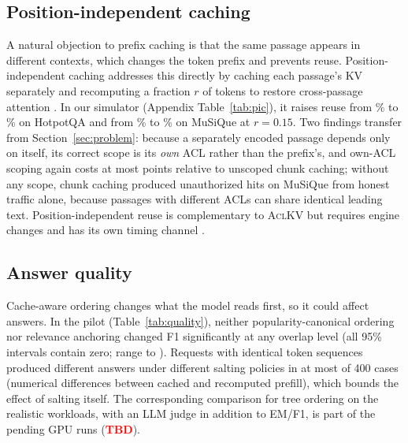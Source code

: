 \documentclass[11pt]{article}
\newcommand{\sysname}{\textsc{AclKV}\xspace}
\newcommand{\tbd}{\textcolor{red}{\textbf{TBD}}}
\begin{document}
\subsection{Position-independent caching}
\label{sec:pic}
A natural objection to prefix caching is that the same passage appears in different contexts, which changes the token prefix and prevents reuse. Position-independent caching addresses this directly by caching each passage's KV separately and recomputing a fraction $r$ of tokens to restore cross-passage attention \citep{yao2025cacheblend}. In our simulator (Appendix Table~\ref{tab:pic}), it raises reuse from \numprefixTreeHQ\% to \numpicAclHQ\% on HotpotQA and from \numprefixTreeMQ\% to \numpicAclMQ\% on MuSiQue at $r{=}0.15$. Two findings transfer from Section~\ref{sec:problem}: because a separately encoded passage depends only on itself, its correct scope is its \emph{own} ACL rather than the prefix's, and own-ACL scoping again costs at most \numpicScopeCost{} points relative to unscoped chunk caching; without any scope, chunk caching produced \numpicGlobalUnauthMQ{} unauthorized hits on MuSiQue from honest traffic alone, because passages with different ACLs can share identical leading text. Position-independent reuse is complementary to \sysname but requires engine changes and has its own timing channel \citep{sun2026spliceleak}.

\subsection{Answer quality}
\label{sec:quality}

\begin{table}[t]
\centering
\small
\setlength{\tabcolsep}{3pt}
\resizebox{\columnwidth}{!}{}
\caption{Pilot answer quality on the live A100 (HotpotQA, Qwen2.5-7B-Instruct, 400 requests per overlap level). Differences to retrieval order; 95\% question-clustered bootstrap CIs.}
\label{tab:quality}
\end{table}

Cache-aware ordering changes what the model reads first, so it could affect answers. In the pilot (Table~\ref{tab:quality}), neither popularity-canonical ordering nor relevance anchoring changed F1 significantly at any overlap level (all 95\% intervals contain zero; range \numvOneCIlow{} to \numvOneCIhigh). Requests with identical token sequences produced different answers under different salting policies in at most \numnoiseFloorMax{} of 400 cases (numerical differences between cached and recomputed prefill), which bounds the effect of salting itself. The corresponding comparison for tree ordering on the realistic workloads, with an LLM judge in addition to EM/F1, is part of the pending GPU runs (\tbd).
\end{document}
